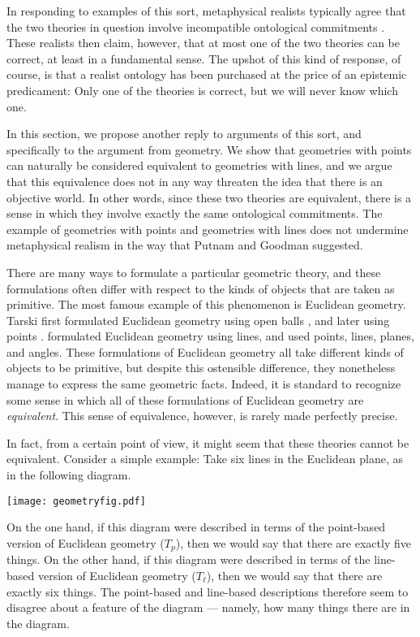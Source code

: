 In responding to examples of this sort, metaphysical realists
typically agree that the two theories in question involve incompatible
ontological commitments \citep[see][]{sider2009,vaninwagen2009}.
These realists then claim, however, that at most one of the two
theories can be correct, at least in a fundamental sense.  The upshot
of this kind of response, of course, is that a realist ontology has
been purchased at the price of an epistemic predicament: Only one of
the theories is correct, but we will never know which one.

In this section, we propose another reply to arguments of this sort,
and specifically to the argument from geometry.  We show that
geometries with points can naturally be considered equivalent to
geometries with lines, and we argue that this equivalence does not in
any way threaten the idea that there is an objective world. In other
words, since these two theories are equivalent, there is a sense in
which they involve exactly the same ontological commitments. The
example of geometries with points and geometries with lines does not
undermine metaphysical realism in the way that Putnam and Goodman
suggested.

There are many ways to formulate a particular geometric theory, and
these formulations often differ with respect to the kinds of objects
that are taken as primitive. The most famous example of this
phenomenon is Euclidean geometry. Tarski first formulated Euclidean
geometry using open balls \citep{tarski1929}, and later using points
\citep{tarski1959}. \cite{schwabhauser1975} formulated Euclidean
geometry using lines, and \cite{hilbert1930} used points, lines,
planes, and angles. These formulations of Euclidean geometry all take
different kinds of objects to be primitive, but despite this
ostensible difference, they nonetheless manage to express the same
geometric facts. Indeed, it is standard to recognize some sense in
which all of these formulations of Euclidean geometry are
\textit{equivalent}. This sense of equivalence, however, is rarely
made perfectly precise.

In fact, from a certain point of view, it might seem that these
theories cannot be equivalent.  Consider a simple example: Take six
lines in the Euclidean plane, as in the following diagram.
\begin{center}
\texttt{[image: geometryfig.pdf]}
\end{center}
On the one hand, if this diagram were described in terms of the
point-based version of Euclidean geometry ($T_p$), then we would say
that there are exactly five things.  On the other hand, if this
diagram were described in terms of the line-based version of Euclidean
geometry ($T_\ell$), then we would say that there are exactly six
things. The point-based and line-based descriptions therefore seem to
disagree about a feature of the diagram --- namely, how many things
there are in the diagram.

